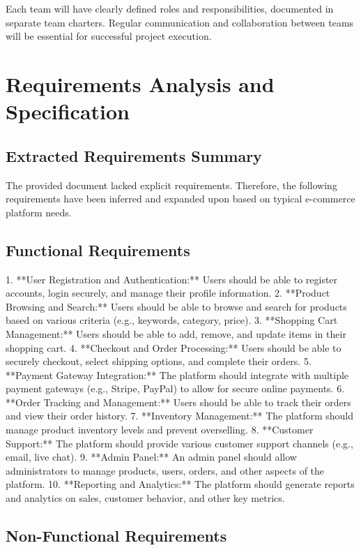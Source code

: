 \documentclass[11pt,a4paper,oneside]{article}
\begin{document}
Each team will have clearly defined roles and responsibilities, documented in separate team charters.  Regular communication and collaboration between teams will be essential for successful project execution.

\section{Requirements Analysis and Specification}

\subsection{Extracted Requirements Summary}
The provided document lacked explicit requirements.  Therefore, the following requirements have been inferred and expanded upon based on typical e-commerce platform needs.

\subsection{Functional Requirements}

1. **User Registration and Authentication:** Users should be able to register accounts, login securely, and manage their profile information.
2. **Product Browsing and Search:** Users should be able to browse and search for products based on various criteria (e.g., keywords, category, price).
3. **Shopping Cart Management:** Users should be able to add, remove, and update items in their shopping cart.
4. **Checkout and Order Processing:** Users should be able to securely checkout, select shipping options, and complete their orders.
5. **Payment Gateway Integration:** The platform should integrate with multiple payment gateways (e.g., Stripe, PayPal) to allow for secure online payments.
6. **Order Tracking and Management:** Users should be able to track their orders and view their order history.
7. **Inventory Management:** The platform should manage product inventory levels and prevent overselling.
8. **Customer Support:** The platform should provide various customer support channels (e.g., email, live chat).
9. **Admin Panel:** An admin panel should allow administrators to manage products, users, orders, and other aspects of the platform.
10. **Reporting and Analytics:** The platform should generate reports and analytics on sales, customer behavior, and other key metrics.

\subsection{Non-Functional Requirements}
\end{document}
